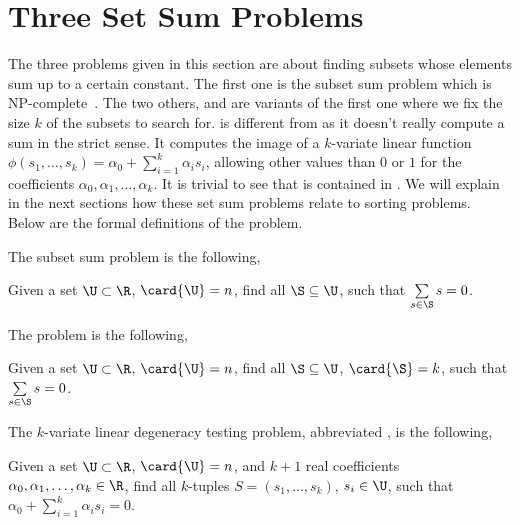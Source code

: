 
\section{Three Set Sum Problems}

The three problems given in this section are about finding subsets whose
elements sum up to a certain constant. The first one is the subset sum problem
which is NP-complete~\cite{karp:1972}. The two others, \kSUM and \kLDT are variants of the
first one where we fix the size $k$ of the subsets to search for. \kLDT is
different from \kSUM as it doesn't really compute a sum in the strict sense.
It computes the image of a $k$-variate linear function $\phi(s_1, \ldots, s_k)
= \alpha_0 + \sum_{i=1}^{k} \alpha_i s_i$, allowing other values than $0$ or
$1$ for the coefficients $\alpha_0, \alpha_1, \ldots, \alpha_k$. It is trivial
to see that \kSUM is contained in \kLDT. We will explain in the next sections
how these set sum problems relate to sorting problems. Below are the formal
definitions of the problem.

The subset sum problem is the following,

\begin{problem}
Given a set $\U \subset \R$, $\card{\U} = n$, find all
$\S \subseteq \U$, such that $\sum\limits_{s \in \S} s = 0$.
\end{problem}


The \kSUM problem is the following,

\begin{problem}
Given a set $\U \subset \R$, $\card{\U} = n$, find all
$\S \subseteq \U$, $\card{\S} = k$, such that $\sum\limits_{s
\in \S} s = 0$.
\end{problem}


The $k$-variate linear degeneracy testing problem, abbreviated \kLDT, is the
following,

\begin{problem}
Given a set $\U \subset \R$, $\card{\U} = n$, and $k+1$ real
coefficients $\alpha_0, \alpha_1, \ldots, \alpha_k \in \R$, find all $k$-tuples
$S = (s_1, \ldots, s_k)$, $s_i \in \U$, such that
$\alpha_0 + \sum_{i=1}^{k} \alpha_i s_i = 0$.
\end{problem}
